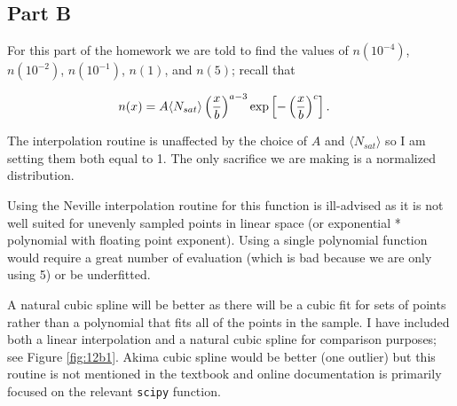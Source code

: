 \subsection{Part B}

For this part of the homework we are told to find the values of $n(10^{-4})$, $n(10^{-2})$, $n(10^{-1})$, $n(1)$, and $n(5)$; recall that

\begin{align}
n(x) &= A\langle N_{sat} \rangle \left({x\over b}\right)^{a-3} \exp\left[-\left({x\over b}\right)^{c}\right].
\end{align}

The interpolation routine is unaffected by the choice of $A$ and $\langle N_{sat} \rangle$ so I am setting them both equal to 1. The only sacrifice we are making is a normalized distribution.


Using the Neville interpolation routine for this function is ill-advised as it is not well suited for unevenly sampled points in linear space (or exponential * polynomial with floating point exponent). Using a single polynomial function would require a great number of evaluation (which is bad because we are only using 5) or be underfitted.

A natural cubic spline will be better as there will be a cubic fit for sets of points rather than a polynomial that fits all of the points in the sample. I have included both a linear interpolation and a natural cubic spline for comparison purposes; see Figure \ref{fig:12b1}. Akima cubic spline would be better (one outlier) but this routine is not mentioned in the textbook and online documentation is primarily focused on the relevant \texttt{scipy} function.


